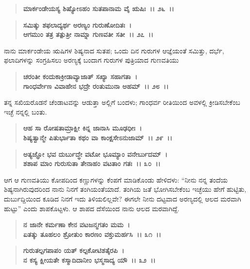 \begin{verse}
\textbf{ಮಾರ್ಕಂಡೇಯಸ್ಯ ಶಿಷ್ಯೋಽಹಂ ಸುತಪಾನಾಮ ವೈ ಋಷಿಃ~।। ೨೬~।।} 
\end{verse}

\begin{verse}
\textbf{ಸಮಿತ್ಕು ಶಫಲಾದ್ಯರ್ಥ ಅರಣ್ಯಂ ಗುರುಣೋದಿತಃ~।}\\\textbf{ಆಗಮುಂ ತತ್ರ ತತ್ಪುತ್ರೀ ನಾಮ್ನಾ ಗುಣವತೀ ಸತೀ~।। ೨೭~।।}
\end{verse}

ನಾನು ಮಾರ್ಕಂಡೇಯ ಋಷಿಗಳ ಶಿಷ್ಯನಾದ ಸುತಪ; ಒಂದು ದಿನ ಗುರುಗಳ ಆಜ್ಞೆಯಂತೆ ಸಮಿತ್ತು, ದರ್ಭೆ, ಫಲಾದಿಗಳನ್ನು ಸಂಗ್ರಹಿಸಲು ಅರಣ್ಯಕ್ಕೆ ಬಂದಾಗ ಗುರುಗಳ ಪುತ್ರಿಯಾದ ಗುಣವತಿಯು

\begin{verse}
\textbf{ಚರಂತೀ ಕಂದುಕಾಕ್ರೀಡಾವ್ಯಾಜಾತ್ ಸಖ್ಯಾ ಸಹಾಗತಾ~।}\\\textbf{ಗಾಂಧರ್ವೇಣ ವಿವಾಹೇನ ಭದ್ರೇ ರಂತುಮುನಾ ಅಹಮ್~।। ೨೮~।।}
\end{verse}

ತನ್ನ ಸಖಿಯರೊಡನೆ ಚೆಂಡಾಟವನ್ನು ಆಡುತ್ತಾ ಅಲ್ಲಿಗೆ ಬಂದಳು; ಗಾಂಧರ್ವ ರೀತಿಯಿಂದ ಅವಳಲ್ಲಿ ಕ್ರೀಡಿಸಬೇಕೆಂಬ ಇಚ್ಛೆ ನನ್ನಲ್ಲಿ ಬಂತು.

\begin{verse}
\textbf{ಆಹ ಸಾ ರೋಷತಾಮ್ರಾಕ್ಷೀ ಕಿನ್ನ ಜಾನಾಸಿ ಮೂಢಧೀಃ~।}\\\textbf{ಶಿಷ್ಯತ್ವಾನ್ಮೇ ಪಿತುರ್ಭಾತಾ ಕಥಂ ವಾ ಕಾಂಕ್ಷಸೇಽನುಜಾಮ್~।। ೨೯~।। }
\end{verse}

\begin{verse}
\textbf{ಅತ್ಯಜ್ಞೋ ಭವ ದುರ್ಬುದ್ಧೇ ವಟೋ ಭೂಮ್ಯಾಂ ವನೇರ್ಬುದಮ್~।}\\\textbf{ಶಶಾಪ ಮಾಂ ಗುರುಸುತಾ ತೇನಾಹಂ ವಟತಾಂ ಗತಃ~।। ೩೦~।।}
\end{verse}

ಆಗ ಆ ಗುಣವತಿಯು ಕೋಪದಿಂದ ಕಣ್ಣುಗಳನ್ನು ಕೆಂಪಗೆ ಮಾಡಿಕೊಂಡು ಹೇಳಿದಳು: “ನೀನು ನನ್ನ ತಂದೆಯ ಶಿಷ್ಯನಾಗಿರುವುದರಿಂದ ನಾನು ನಿನಗೆ ತಂಗಿಯಂತೆಯಾದೆ. ತಂಗಿಯ ಜತೆ ಭೋಗಿಸಬೇಕೆಂಬ ಇಚ್ಛೆಯು ಹೇಗೆ ಹುಟ್ಟಿತು, ದುರ್ಬುದ್ದಿಯಿಂದ ಕೂಡಿದ ನಿನಗೆ ಇದು ತಿಳಿಯಲಿಲ್ಲವೇ? ಈಗಲೇ ನೀನು ದಟ್ಟವಾದ ಅರಣ್ಯದಲ್ಲಿ ಆಲದ ಮರವಾಗಿ ಹುಟ್ಟು” ಎಂದು ಶಾಪಕೊಟ್ಟಳು. ಆ ಶಾಪದ ದೆಸೆಯಿಂದ ನಾನು ಆಲದ ಮರವಾಗಿದ್ದೆ.

\begin{verse}
\textbf{ನ ಜಾನೇ ಕರ್ಮಣಾ ಕೇನ ವಟಜನ್ಮಗತಂ ಮಮ~।}\\\textbf{ಏತತ್ಕು ತೂಹಲಂ ಶ್ರೋತುಂ ಕಾರಣಂ ವಕ್ತುಮರ್ಹಸಿ~।। ೩೧~।।} 
\end{verse}

\begin{verse}
\textbf{ಗುರುತಲ್ಪಗಪಾಪಂ ಯತ್ ಕಲ್ಪಕೋಟಿಶತೈರಪಿ~।}\\\textbf{ನ ಕಸ್ಯ ಕ್ಷೀಯತೇ ಕಸ್ಮಾದಿದಾನೀಂ ಭಸ್ಮಸಾದ್ಯ ಯೌ~।। ೩೨~।। }
\end{verse}

